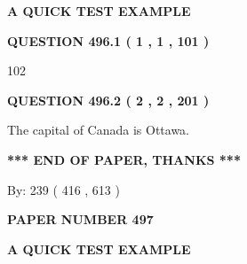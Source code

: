 \documentclass[12pt]{article}
\begin{document}
   
 \vspace{0.2in}
{\LARGE {\textbf{ A QUICK TEST EXAMPLE}}}
   
   
  
\vspace{0.2in}
  
{\textbf{\Large{QUESTION
496.1 
 ( 1 , 1 , 101 )
}}}
  
  
 
 
\noindent{}

102
 
 
  
\vspace{0.2in}
  
{\textbf{\Large{QUESTION
496.2 
 ( 2 , 2 , 201 )
}}}
  
  
 
 
\noindent{}
 
 
The capital of Canada is Ottawa.
 
 
 
 
   
   
 \vspace{0.2in}
 
   
   
   
   
\vspace{1.0in} 
{\textbf{\large{ *** END OF PAPER, THANKS *** }}} 
   
   
\hspace{1.0in} By: 
 239 ( 416 ,  613 )
   
   
   
   
\newpage 
\setcounter{page}{ 
   497001 } 
   
   
   
   
 {\textbf{ \Large{ PAPER NUMBER  497  }}}
   
   
\vspace{0.2in}
   
   
   
   
   
   
 \vspace{0.2in}
{\LARGE {\textbf{ A QUICK TEST EXAMPLE}}}
   
   
  
\vspace{0.2in}
  
\end{document}
